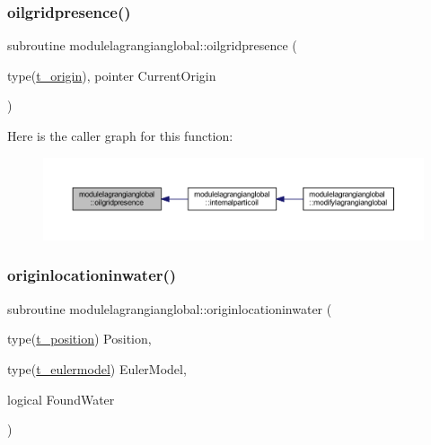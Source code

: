 \subsubsection{\texorpdfstring{oilgridpresence()}{oilgridpresence()}}
{\footnotesize\ttfamily subroutine modulelagrangianglobal\+::oilgridpresence (\begin{DoxyParamCaption}\item[{type(\mbox{\hyperlink{structmodulelagrangianglobal_1_1t__origin}{t\+\_\+origin}}), pointer}]{Current\+Origin }\end{DoxyParamCaption})\hspace{0.3cm}{\ttfamily [private]}}

Here is the caller graph for this function\+:\nopagebreak
\begin{figure}[H]
\begin{center}
\leavevmode
\includegraphics[width=350pt]{namespacemodulelagrangianglobal_aa8eb3a0829714276b28efb92746fc92f_icgraph}
\end{center}
\end{figure}
\mbox{\label{namespacemodulelagrangianglobal_a30ffc99c4d1df3eba66898b8f54fd8e8}} 
\subsubsection{\texorpdfstring{originlocationinwater()}{originlocationinwater()}}
{\footnotesize\ttfamily subroutine modulelagrangianglobal\+::originlocationinwater (\begin{DoxyParamCaption}\item[{type(\mbox{\hyperlink{structmodulelagrangianglobal_1_1t__position}{t\+\_\+position}})}]{Position,  }\item[{type(\mbox{\hyperlink{structmodulelagrangianglobal_1_1t__eulermodel}{t\+\_\+eulermodel}})}]{Euler\+Model,  }\item[{logical}]{Found\+Water }\end{DoxyParamCaption})\hspace{0.3cm}{\ttfamily [private]}}

